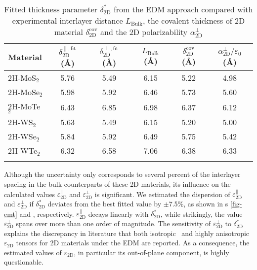 \begin{table}[!htbp]
  \centering
  \caption{Fitted thickness parameter $\delta_{\mathrm{2D}}^{*}$ from
    the EDM approach compared with experimental interlayer distance
    $L_{\mathrm{Bulk}}$, the covalent thickness of 2D material
    $\delta_{\mathrm{2D}}^{\mathrm{cov}}$ and the 2D polarizability
    $\alpha_{\mathrm{2D}}^{\perp}$}
  \label{tab:diel-fitting}
  \begin{tabular}[htbp]{lccccc}
  \hline{}
  Material & $\delta_{\mathrm{2D}}^{\parallel, \mathrm{fit}}$ (\AA) & $\delta_{\mathrm{2D}}^{\perp, \mathrm{fit}}$ ({\AA})& $L_{\mathrm{Bulk}}$ ({\AA}) & $\delta_{\mathrm{2D}}^{\mathrm{cov}}$ ({\AA}) & $\alpha_{\mathrm{2D}}^{\perp}/\varepsilon_{0}$ ({\AA})\\
  \hline{}
  2H-MoS$_{2}$ & 5.76 & 5.49 & 6.15 & 5.22 & 4.98\\
  2H-MoSe$_{2}$ & 5.98 & 5.92 & 6.46 &  5.73 & 5.60\\
  2H-MoTe$_{2}$ & 6.43 & 6.85 & 6.98 & 6.37 & 6.12\\
  2H-WS$_{2}$ & 5.63 & 5.49 & 6.15 & 5.20 & 5.00\\
  2H-WSe$_{2}$ & 5.84 & 5.92 & 6.49 & 5.75 & 5.42\\
  2H-WTe$_{2}$ & 6.32 & 6.58 & 7.06 & 6.38 & 6.33\\
  \hline{}
  \end{tabular}
\end{table}
% 
%
Although the uncertainty only corresponds to several percent of the
interlayer spacing in the bulk counterparts of these 2D materials, its
influence on the calculated values
$\varepsilon_{\mathrm{2D}}^{\parallel}$ and
$\varepsilon_{\mathrm{2D}}^{\perp}$ is significant. We estimated the
dispersion of $\varepsilon_{\mathrm{2D}}^{\parallel}$ and
$\varepsilon_{\mathrm{2D}}^{\perp}$ if $\delta^{*}_{\mathrm{2D}}$
deviates from the best fitted value by $\pm{}$7.5\%, as shown in
s \autoref{fig-emt} and ,
respectively. $\varepsilon_{\mathrm{2D}}^{\parallel}$ decays linearly
with $\delta^{*}_{\mathrm{2D}}$,
while strikingly, the value $\varepsilon_{\mathrm{2D}}^{\perp}$ spans
over more than one order of magnitude. The sensitivity of
$\varepsilon_{\mathrm{2D}}^{\perp}$ to $\delta^{*}_{\mathrm{2D}}$
explains the discrepancy in literature that both
isotropic~\cite{Sohier_2016_2D_eps} and highly
anisotropic~\cite{Matthes_2016_effective_PRB,Laturia_2018_2D_eps}
$\varepsilon_{\mathrm{2D}}$ tensors for 2D materials under the EDM are
reported. As a consequence, the estimated values of
$\varepsilon_{\mathrm{2D}}$, in particular its out-of-plane component,
is highly questionable.

